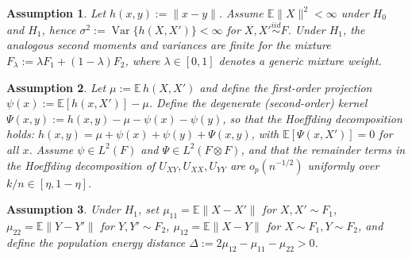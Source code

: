 \documentclass[11pt]{article}
\newtheorem{assumption}{Assumption}
\numberwithin{theorem}{section}
\numberwithin{Lemma}{section}
\numberwithin{Definition}{section}
\newcommand{\Ex}{\mathbb{E}}          %
\begin{document}
\begin{assumption}\label{A:moment}
Let $h(x,y):=\|x-y\|$. Assume $\mathbb E\|X\|^2<\infty$ under $H_0$ and $H_1$, hence
$\sigma^2:=\operatorname{Var}\{h(X,X')\}<\infty$ for $X,X'\stackrel{iid}{\sim}F$. Under $H_1$, the analogous second moments and variances are finite for the mixture $F_\lambda:=\lambda  F_1+(1-\lambda )F_2$, where $\lambda \in[0,1]$ denotes a generic mixture weight.
\end{assumption}



\begin{assumption}\label{A:Ustat}
Let $\mu:=\mathbb{E}\,h(X,X')$ and define the first-order projection
$\psi(x):=\mathbb{E}[h(x,X')]-\mu$. Define the degenerate (second-order) kernel $\Psi(x,y):=h(x,y)-\mu-\psi(x)-\psi(y)$, so that the Hoeffding decomposition holds:
$h(x,y)=\mu+\psi(x)+\psi(y)+\Psi(x,y)$, with
$\mathbb{E}[\Psi(x,X')]=0$ for all $x$.
Assume $\psi\in L^2(F)$ and $\Psi\in L^2(F\otimes F)$, and that the remainder terms in the Hoeffding
decomposition of $U_{XY},U_{XX},U_{YY}$ are $o_p(n^{-1/2})$ uniformly over $k/n\in[\eta,1-\eta]$.
\end{assumption}


\begin{assumption}\label{A:delta}
Under $H_1$, set
$\mu_{11}=\Ex\|X-X'\|$ for $X,X'\sim F_1$,
$\mu_{22}=\Ex\|Y-Y'\|$ for $Y,Y'\sim F_2$,
$\mu_{12}=\Ex\|X-Y\|$ for $X\sim F_1,Y\sim F_2$,
and define the population energy distance
$\Delta:=2\mu_{12}-\mu_{11}-\mu_{22}>0$.
\end{assumption}
\end{document}
